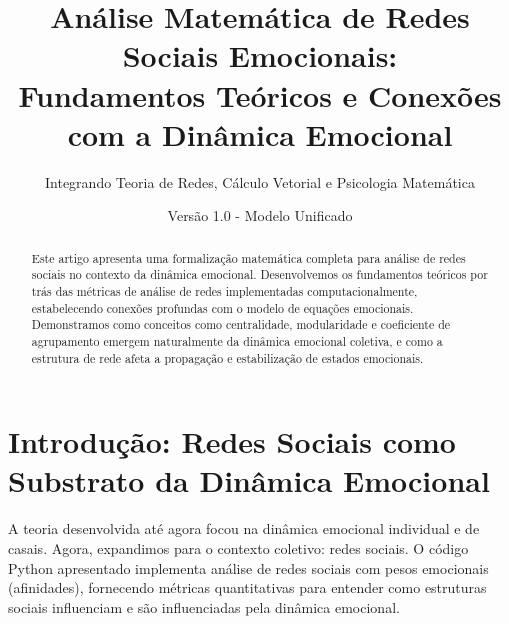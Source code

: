 \documentclass[12pt, a4paper]{article}
\title{Análise Matemática de Redes Sociais Emocionais: \\
       Fundamentos Teóricos e Conexões com a Dinâmica Emocional}
\author{Integrando Teoria de Redes, Cálculo Vetorial e Psicologia Matemática}
\date{Versão 1.0 - Modelo Unificado}
\begin{document}
\maketitle

\begin{abstract}
Este artigo apresenta uma formalização matemática completa para análise de redes sociais no contexto da dinâmica emocional. Desenvolvemos os fundamentos teóricos por trás das métricas de análise de redes implementadas computacionalmente, estabelecendo conexões profundas com o modelo de equações emocionais. Demonstramos como conceitos como centralidade, modularidade e coeficiente de agrupamento emergem naturalmente da dinâmica emocional coletiva, e como a estrutura de rede afeta a propagação e estabilização de estados emocionais.
\end{abstract}

\tableofcontents

\section{Introdução: Redes Sociais como Substrato da Dinâmica Emocional}

A teoria desenvolvida até agora focou na dinâmica emocional individual e de casais. Agora, expandimos para o contexto coletivo: redes sociais. O código Python apresentado implementa análise de redes sociais com pesos emocionais (afinidades), fornecendo métricas quantitativas para entender como estruturas sociais influenciam e são influenciadas pela dinâmica emocional.

\begin{center}
\end{center}
\end{document}
